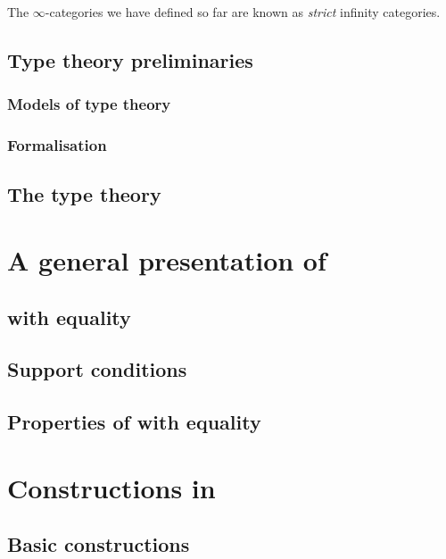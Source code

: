 \documentclass{cam-thesis}
\begin{document}
The \(\infty\)-categories we have defined so far are known as \emph{strict} infinity categories.

\section{Type theory preliminaries}
\label{sec:type-theory}

\subsection{Models of type theory}
\label{sec:models-type-theory}

\subsection{Formalisation}
\label{sec:formalisation}

\section{The type theory \Catt}
\label{sec:type-theory-catt}

\chapter{A general presentation of \Catt}
\label{cha:gener-pres-catt}

\section{\Catt with equality}
\label{sec:catt-with-equality}

\section{Support conditions}
\label{sec:support-conditions}

\section{Properties of \Catt with equality}
\label{sec:properties-catt-with}

\chapter{Constructions in \Catt}
\label{sec:operations-catt}

\section{Basic constructions}
\label{sec:basic-constructions}
\end{document}
